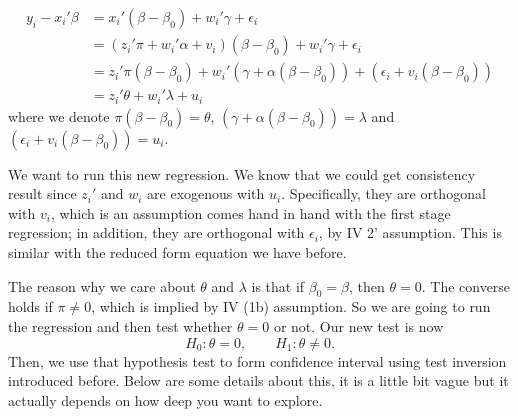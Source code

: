 \documentclass[11pt,a4paper]{amsart}
\theoremstyle{plain}
\theoremstyle{definition}
\begin{document}
	\[	\begin{aligned}
			y_{i} - x_{i}'\beta &= x_{i}'(\beta - \beta_{0}) + w_{i}' \gamma + \epsilon_{i} \\
			&= (z_{i}'\pi + w_{i}'\alpha + v_{i})(\beta - \beta_{0}) + w_{i}' \gamma + \epsilon_{i}\\
			&= z_{i}'\pi(\beta - \beta_{0}) + w_{i}'(\gamma + \alpha(\beta - \beta_{0})) + (\epsilon_{i} + v_{i}(\beta - \beta_{0}))\\
			&= z_{i}'\theta + w_{i}'\lambda + u_{i}
	\end{aligned}	\]
	where we denote $\pi(\beta - \beta_{0}) = \theta$, $(\gamma + \alpha(\beta - \beta_{0})) = \lambda$ and $(\epsilon_{i} + v_{i}(\beta - \beta_{0})) = u_{i}$. \par 
	We want to run this new regression. We know that we could get consistency result since $z_{i}'$ and $w_{i}$ are exogenous with $u_{i}$. Specifically, they are orthogonal with $v_{i}$, which is an assumption comes hand in hand with the first stage regression; in addition, they are orthogonal with $\epsilon_{i}$, by IV 2' assumption. This is similar with the reduced form equation we have before. \par 
	The reason why we care about $\theta$ and $\lambda$ is that if $\beta_{0} = \beta$, then $\theta = 0$. The converse holds if $\pi \ne 0$, which is implied by IV (1b) assumption. So we are going to run the regression and then test whether $\theta = 0$ or not. Our new test is now 
		\[	H_{0} : \theta = 0, \qquad H_{1} : \theta \ne 0.	\]
	Then, we use that hypothesis test to form confidence interval using test inversion introduced before. Below are some details about this, it is a little bit vague but it actually depends on how deep you want to explore. 
\end{document}
